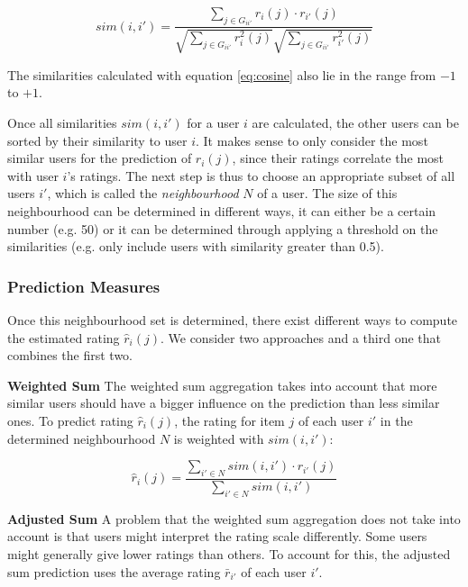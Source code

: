 \begin{equation}
sim(i,i') = \frac{\sum_{j \in G_{ii'}}{r_{i}(j)\cdot r_{i'}(j)}}{\sqrt{\sum_{j \in G_{ii'}}{{r_{i}^2}(j)}}\sqrt{\sum_{j \in G_{ii'}}{{r_{i'}^2}(j)}}}
\label{eq:cosine}
\end{equation}

The similarities calculated with equation \eqref{eq:cosine} also lie in the range from $-1$ to $+1$.
\newline

Once all similarities $sim(i,i')$ for a user $i$ are calculated, the other users can be sorted by their similarity to user $i$. It makes sense to only consider the most similar users for the prediction of $\hat{r}_i(j)$, since their ratings correlate the most with user $i$'s ratings. The next step is thus to choose an appropriate subset of all users $i'$, which is called the \textit{neighbourhood} $N$ of a user. The size of this neighbourhood can be determined in different ways, it can either be a certain number (e.g. 50) or it can be determined through applying a threshold on the similarities (e.g. only include users with similarity greater than 0.5).

\subsubsection{Prediction Measures}
\label{ssst:predictionmeasures} Once this neighbourhood set is determined, there exist different ways to compute the estimated rating $\hat{r}_i(j)$. We consider two approaches and a third one that combines the first two.
\newline

\textbf{Weighted Sum} The weighted sum aggregation takes into account that more similar users should have a bigger influence on the prediction than less similar ones. To predict rating $\hat{r}_i(j)$, the rating for item $j$ of each user $i'$ in the determined neighbourhood $N$ is weighted with $sim(i,i')$:

\begin{equation}
\hat{r}_i(j) = \frac{\sum_{i' \in N}{sim(i,i')\cdot r_{i'}(j)}}{\sum_{i' \in N}{sim(i,i')}}
\label{eq:weightedsum}
\end{equation}
\newline

\textbf{Adjusted Sum} A problem that the weighted sum aggregation does not take into account is that users might interpret the rating scale differently. Some users might generally give lower ratings than others. To account for this, the adjusted sum prediction uses the average rating $\bar{r}_{i'}$ of each user $i'$.

